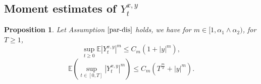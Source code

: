 \documentclass[11pt,reqno]{amsart}
\newtheorem{proposition}{\indent Proposition}[section]
\numberwithin{equation}{section}
\begin{document}
\subsection{Moment estimates of $ Y_{t}^{ x,y}$}
\begin{proposition}\label{P41}
	Let  Assumption $\ref{par-dis}$ holds, we have for $m\in [1,\alpha_{1}\wedge\alpha_{2})$, for $T\geq 1$,
	\begin{equation}\label{4.4}
	\sup_{t\geq0} \mathbb{E}|Y_{t}^{ x,y}|^{m}\leq C_{m}(1+|y|^{m}),
	\end{equation}
	\begin{equation}\label{4.5}
		\mathbb{E}\left(\sup_{t\in [0,T]} |Y_{t}^{ x,y}|^{m}\right)\leq C_{m}(T^{\frac{m}{2}}+|y|^{m}).
	\end{equation}
\end{proposition}
\end{document}
